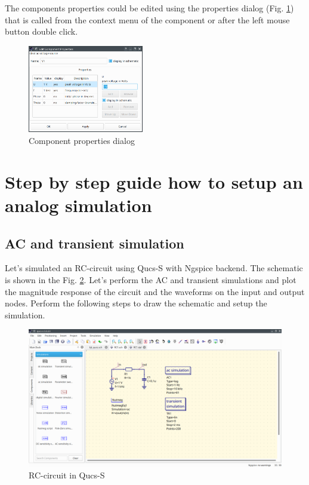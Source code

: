 \documentclass[a4paper,12pt]{article}
\begin{document}
The components properties could be edited using the properties dialog (Fig. \ref{fig:prop_dlg}) that is called from the context menu of the component or after the left mouse button double click. 

\begin{figure}[!ht]
  \begin{center}
    \includegraphics[width=0.45\textwidth]{img/prop_dlg.png}
  \end{center}
  \caption{Component properties dialog} \label{fig:prop_dlg}
\end{figure}

\section{Step by step guide how to setup an analog simulation}

\subsection{AC and transient simulation}

Let's simulated an RC-circuit using Qucs-S with Ngspice backend. The schematic is shown in the Fig. \ref{fig:rc}. Let's perform the AC and transient simulations and plot the magnitude response of the circuit and the waveforms on the input and output nodes. Perform the following steps to draw the schematic and setup the simulation. 

\begin{figure}[!ht]
  \begin{center}
    \includegraphics[width=\textwidth]{img/rc.png}
  \end{center}
  \caption{RC-circuit in Qucs-S} \label{fig:rc}
\end{figure}
\end{document}

